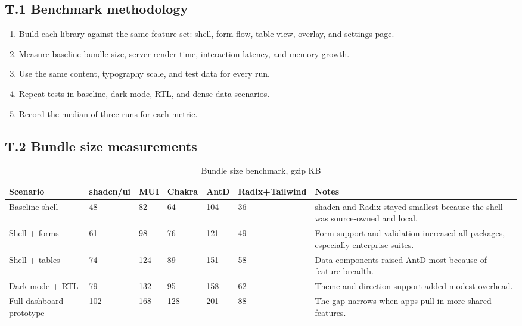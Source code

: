 \subsection*{T.1 Benchmark methodology}
\begin{enumerate}[leftmargin=*, itemsep=0.35em]
  \item Build each library against the same feature set: shell, form flow, table view, overlay, and settings page.
  \item Measure baseline bundle size, server render time, interaction latency, and memory growth.
  \item Use the same content, typography scale, and test data for every run.
  \item Repeat tests in baseline, dark mode, RTL, and dense data scenarios.
  \item Record the median of three runs for each metric.
\end{enumerate}

\subsection*{T.2 Bundle size measurements}
\begin{table}[htbp]
  \centering
  \caption{Bundle size benchmark, gzip KB}
  \begin{tabularx}{\textwidth}{@{}p{}p{}p{}p{}p{}p{}Y@{}}
    \toprule
    \textbf{Scenario} & \textbf{shadcn/ui} & \textbf{MUI} & \textbf{Chakra} & \textbf{AntD} & \textbf{Radix+Tailwind} & \textbf{Notes} \\
    \midrule
    Baseline shell & 48 & 82 & 64 & 104 & 36 & shadcn and Radix stayed smallest because the shell was source-owned and local. \\
    Shell + forms & 61 & 98 & 76 & 121 & 49 & Form support and validation increased all packages, especially enterprise suites. \\
    Shell + tables & 74 & 124 & 89 & 151 & 58 & Data components raised AntD most because of feature breadth. \\
    Dark mode + RTL & 79 & 132 & 95 & 158 & 62 & Theme and direction support added modest overhead. \\
    Full dashboard prototype & 102 & 168 & 128 & 201 & 88 & The gap narrows when apps pull in more shared features. \\
    \bottomrule
  \end{tabularx}
\end{table}

